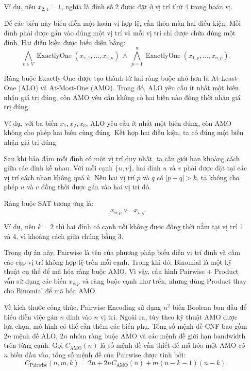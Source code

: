 \documentclass[a4paper,fleqn]{cas-sc}
\begin{document}
Ví dụ, nếu $x_{2,4}=1$, nghĩa là đỉnh số 2 được đặt ở vị trí thứ 4 trong hoán vị.

Để các biến này biểu diễn một hoán vị hợp lệ, cần thỏa mãn hai điều kiện: Mỗi đỉnh phải được gán vào đúng một vị trí và mỗi vị trí chỉ được chứa đúng một đỉnh. Hai điều kiện được biểu diễn bằng:
\begin{equation}
\bigwedge_{v\in V}
\operatorname{ExactlyOne}(x_{v,1},\ldots,x_{v,n})
\ \land\
\bigwedge_{p=1}^{n}
\operatorname{ExactlyOne}(x_{1,p},\ldots,x_{n,p}).
\label{eq:eo}
\end{equation}

Ràng buộc Exactly-One được tạo thành từ hai ràng buộc nhỏ hơn là At-Least-One (ALO) và At-Most-One (AMO). Trong đó, ALO yêu cầu ít nhất một biến nhận giá trị đúng, còn AMO yêu cầu không có hai biến nào đồng thời nhận giá trị đúng.

Ví dụ, với ba biến $x_1,x_2,x_3$, ALO yêu cầu ít nhất một biến đúng, còn AMO không cho phép hai biến cùng đúng. Kết hợp hai điều kiện, ta có đúng một biến nhận giá trị đúng.

Sau khi bảo đảm mỗi đỉnh có một vị trí duy nhất, ta cần giới hạn khoảng cách giữa các đỉnh kề nhau. Với mỗi cạnh $\{u,v\}$, hai đỉnh $u$ và $v$ phải được đặt tại các vị trí cách nhau không quá $k$. Nếu hai vị trí $p$ và $q$ có $|p-q|>k$, ta không cho phép $u$ và $v$ đồng thời được gán vào hai vị trí đó.

Ràng buộc SAT tương ứng là:
\begin{equation}
\neg x_{u,p}\lor\neg x_{v,q}.
\label{eq:pair-edge}
\end{equation}

Ví dụ, nếu $k=2$ thì hai đỉnh có cạnh nối không được đồng thời nằm tại vị trí 1 và 4, vì khoảng cách giữa chúng bằng 3.

Trong dự án này, Pairwise là tên của phương pháp biểu diễn vị trí đỉnh và cấm các cặp vị trí không hợp lệ trên mỗi cạnh. Trong khi đó, Binomial là một kỹ thuật cụ thể để mã hóa ràng buộc AMO. Vì vậy, cấu hình Pairwise + Product vẫn sử dụng các biến $x_{v,p}$ và ràng buộc cạnh như trên, nhưng dùng Product thay cho Binomial để mã hóa AMO.


Về kích thước công thức, Pairwise Encoding sử dụng $n^2$ biến Boolean ban đầu để biểu diễn việc gán $n$ đỉnh vào $n$ vị trí. Ngoài ra, tùy theo kỹ thuật AMO được lựa chọn, mô hình có thể cần thêm các biến phụ. Tổng số mệnh đề CNF bao gồm $2n$ mệnh đề ALO, $2n$ nhóm ràng buộc AMO và các mệnh đề giới hạn bandwidth trên từng cạnh. Gọi $C_{\mathrm{AMO}}(n)$ là số mệnh đề cần thiết để mã hóa một AMO có $n$ biến đầu vào, tổng số mệnh đề của Pairwise được tính bởi:
\begin{equation}
C_{\mathrm{Pairwise}}(n,m,k)
=2n+2nC_{\mathrm{AMO}}(n)+m(n-k-1)(n-k).
\label{eq:pairwise-size}
\end{equation}
\end{document}
